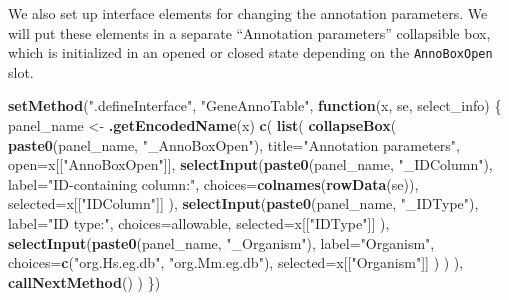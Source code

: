 \documentclass[]{book}
\newenvironment{Shaded}{\begin{snugshade}}{\end{snugshade}}
\newcommand{\KeywordTok}[1]{\textcolor[rgb]{0.13,0.29,0.53}{\textbf{#1}}}
\newcommand{\DataTypeTok}[1]{\textcolor[rgb]{0.13,0.29,0.53}{#1}}
\newcommand{\StringTok}[1]{\textcolor[rgb]{0.31,0.60,0.02}{#1}}
\newcommand{\ControlFlowTok}[1]{\textcolor[rgb]{0.13,0.29,0.53}{\textbf{#1}}}
\newcommand{\NormalTok}[1]{#1}
\begin{document}
We also set up interface elements for changing the annotation
parameters. We will put these elements in a separate ``Annotation
parameters'' collapsible box, which is initialized in an opened or
closed state depending on the \texttt{AnnoBoxOpen} slot.

\begin{Shaded}
\begin{Highlighting}[]
\KeywordTok{setMethod}\NormalTok{(}\StringTok{".defineInterface"}\NormalTok{, }\StringTok{"GeneAnnoTable"}\NormalTok{, }\ControlFlowTok{function}\NormalTok{(x, se, select_info) \{}
\NormalTok{    panel_name <-}\StringTok{ }\KeywordTok{.getEncodedName}\NormalTok{(x)}
    \KeywordTok{c}\NormalTok{(}
        \KeywordTok{list}\NormalTok{(}
            \KeywordTok{collapseBox}\NormalTok{(}
                \KeywordTok{paste0}\NormalTok{(panel_name, }\StringTok{"_AnnoBoxOpen"}\NormalTok{),}
                \DataTypeTok{title=}\StringTok{"Annotation parameters"}\NormalTok{,}
                \DataTypeTok{open=}\NormalTok{x[[}\StringTok{"AnnoBoxOpen"}\NormalTok{]],}
                \KeywordTok{selectInput}\NormalTok{(}\KeywordTok{paste0}\NormalTok{(panel_name, }\StringTok{"_IDColumn"}\NormalTok{),}
                    \DataTypeTok{label=}\StringTok{"ID-containing column:"}\NormalTok{,}
                    \DataTypeTok{choices=}\KeywordTok{colnames}\NormalTok{(}\KeywordTok{rowData}\NormalTok{(se)), }
                    \DataTypeTok{selected=}\NormalTok{x[[}\StringTok{"IDColumn"}\NormalTok{]]}
\NormalTok{                ),}
                \KeywordTok{selectInput}\NormalTok{(}\KeywordTok{paste0}\NormalTok{(panel_name, }\StringTok{"_IDType"}\NormalTok{),}
                    \DataTypeTok{label=}\StringTok{"ID type:"}\NormalTok{,}
                    \DataTypeTok{choices=}\NormalTok{allowable,}
                    \DataTypeTok{selected=}\NormalTok{x[[}\StringTok{"IDType"}\NormalTok{]]}
\NormalTok{                ),}
                \KeywordTok{selectInput}\NormalTok{(}\KeywordTok{paste0}\NormalTok{(panel_name, }\StringTok{"_Organism"}\NormalTok{),}
                    \DataTypeTok{label=}\StringTok{"Organism"}\NormalTok{,}
                    \DataTypeTok{choices=}\KeywordTok{c}\NormalTok{(}\StringTok{"org.Hs.eg.db"}\NormalTok{, }\StringTok{"org.Mm.eg.db"}\NormalTok{),}
                    \DataTypeTok{selected=}\NormalTok{x[[}\StringTok{"Organism"}\NormalTok{]]}
\NormalTok{                )}
\NormalTok{            )}
\NormalTok{        ),}
        \KeywordTok{callNextMethod}\NormalTok{()}
\NormalTok{    ) }
\NormalTok{\})}
\end{Highlighting}
\end{Shaded}
\end{document}
